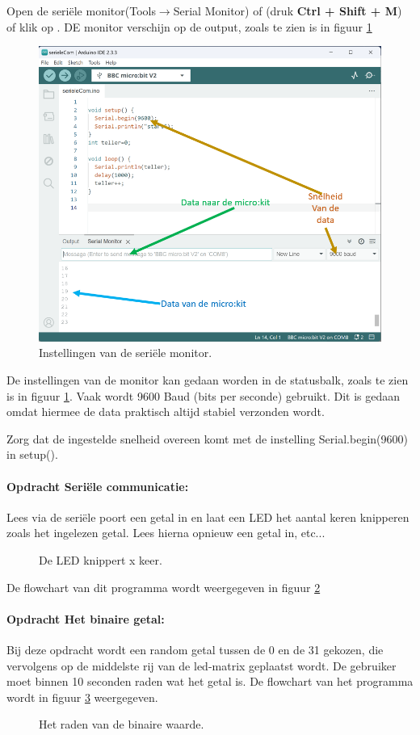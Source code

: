 Open de seriële monitor(Tools$\rightarrow$Serial Monitor) of (druk \colorbox{mygray}{\textbf{Ctrl + Shift + M}}) of klik op . DE monitor verschijn op de output, zoals te zien is in figuur \ref{fig:arser}
\begin{figure}[H]
	\captionsetup{justification=centering}
	\includegraphics[width=0.5 \linewidth]{figuren/serial}
	\centering
	\caption{Instellingen van de seriële monitor.}
	\label{fig:arser}
\end{figure}
De instellingen van de monitor kan gedaan worden in de statusbalk, zoals te zien is in figuur \ref{fig:arser}.
Vaak wordt 9600 Baud (bits per seconde) gebruikt. Dit is gedaan omdat hiermee de data praktisch altijd stabiel verzonden wordt.

Zorg dat de ingestelde snelheid overeen komt met de instelling \textcolor{BurntOrange}{Serial.begin}(9600) in  \textcolor{OliveGreen}{setup}(). 


\paragraph{Opdracht Seriële communicatie:} \label{blad:aantalknipper}
Lees via de seriële poort een getal in en laat een LED het aantal keren knipperen zoals het ingelezen getal. Lees hierna opnieuw een getal in, etc...
\begin{figure}[H]
	\captionsetup{justification=centering}
	\centering
	\eerstefc

	\caption{De LED knippert x keer.}
	\label{fig:flowchart1}
\end{figure}
De flowchart van dit programma wordt weergegeven in figuur \ref{fig:flowchart1}

\paragraph{Opdracht Het binaire getal:} \label{blz:bineairGetal}
Bij deze opdracht wordt een random getal tussen de 0 en de 31 gekozen, die vervolgens op de middelste rij van de led-matrix geplaatst wordt. De gebruiker moet binnen 10 seconden raden wat het getal is. De flowchart van het programma wordt in figuur \ref{fig:flowchart2} weergegeven.
\begin{figure}[H]
	\captionsetup{justification=centering}
	\centering
	\randomfc
	
	\caption{Het raden van de binaire waarde.}
	\label{fig:flowchart2}
\end{figure}


